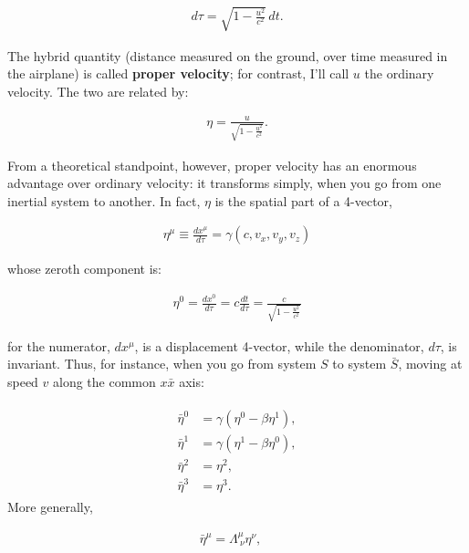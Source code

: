 \documentclass[12pt]{book}
\begin{document}
        \begin{align}
        d\tau = \sqrt{1 - \frac{u^2}{c^2}} \, dt.
        \end{align}
        
        The hybrid quantity (distance measured on the ground, over time measured in the airplane) is called \textbf{proper velocity}; for contrast, I’ll call \(u\) the ordinary velocity. The two are related by:
        
        \begin{align}
        \eta = \frac{u}{\sqrt{1 - \frac{u^2}{c^2}}}.
        \end{align}
        
        From a theoretical standpoint, however, proper velocity has an enormous advantage over ordinary velocity: it transforms simply, when you go from one inertial system to another. In fact, \(\eta\) is the spatial part of a 4-vector,
        
        \begin{align}
        \eta^\mu \equiv \frac{dx^\mu}{d\tau}=\gamma(c, v_x, v_y, v_z)
        \end{align}
        
        whose zeroth component is:
        
        \begin{align}
        \eta^0 = \frac{dx^0}{d\tau} = c \frac{dt}{d\tau} = \frac{c}{\sqrt{1 - \frac{u^2}{c^2}}}
        \end{align}
        
        for the numerator, \(dx^\mu\), is a displacement 4-vector, while the denominator, \(d\tau\), is invariant. Thus, for instance, when you go from system \(S\) to system \(\bar{S}\), moving at speed \(v\) along the common \(x\)\(\bar{x}\) axis:
        
        \begin{align}
        \begin{aligned}
        \bar{\eta}^0 &= \gamma (\eta^0 - \beta \eta^1), \\
        \bar{\eta}^1 &= \gamma (\eta^1 - \beta \eta^0), \\
        \bar{\eta}^2 &= \eta^2, \\
        \bar{\eta}^3 &= \eta^3.
        \end{aligned}
        \end{align}
        More generally,
        
        \begin{align}
        \bar{\eta}^\mu = \Lambda^\mu_{\ \nu} \eta^\nu, \quad
        \end{align}
        
\end{document}
